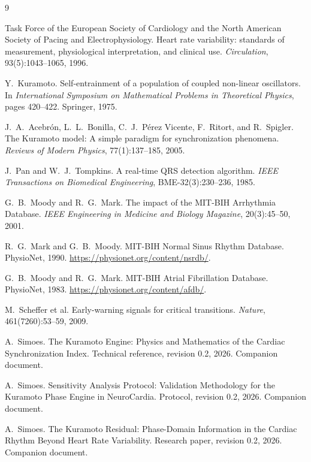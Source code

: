 \documentclass[11pt]{article}
\begin{document}
\begin{thebibliography}{9}

Task Force of the European Society of Cardiology and the North American
Society of Pacing and Electrophysiology. Heart rate variability:
standards of measurement, physiological interpretation, and clinical
use. \emph{Circulation}, 93(5):1043--1065, 1996.

Y.~Kuramoto. Self-entrainment of a population of coupled non-linear
oscillators. In \emph{International Symposium on Mathematical Problems
in Theoretical Physics}, pages 420--422. Springer, 1975.

J.~A.~Acebr\'on, L.~L.~Bonilla, C.~J.~P\'erez Vicente, F.~Ritort, and
R.~Spigler. The Kuramoto model: A simple paradigm for synchronization
phenomena. \emph{Reviews of Modern Physics}, 77(1):137--185, 2005.

J.~Pan and W.~J.~Tompkins. A real-time QRS detection algorithm.
\emph{IEEE Transactions on Biomedical Engineering},
BME-32(3):230--236, 1985.

G.~B.~Moody and R.~G.~Mark. The impact of the MIT-BIH Arrhythmia
Database. \emph{IEEE Engineering in Medicine and Biology Magazine},
20(3):45--50, 2001.

R.~G.~Mark and G.~B.~Moody. MIT-BIH Normal Sinus Rhythm Database.
PhysioNet, 1990. \url{https://physionet.org/content/nsrdb/}.

G.~B.~Moody and R.~G.~Mark. MIT-BIH Atrial Fibrillation Database.
PhysioNet, 1983. \url{https://physionet.org/content/afdb/}.

M.~Scheffer et al. Early-warning signals for critical transitions.
\emph{Nature}, 461(7260):53--59, 2009.

A.~Simoes. The Kuramoto Engine: Physics and Mathematics of the Cardiac
Synchronization Index. Technical reference, revision 0.2, 2026.
Companion document.

A.~Simoes. Sensitivity Analysis Protocol: Validation Methodology for
the Kuramoto Phase Engine in NeuroCardia. Protocol, revision 0.2,
2026. Companion document.

A.~Simoes. The Kuramoto Residual: Phase-Domain Information in the
Cardiac Rhythm Beyond Heart Rate Variability. Research paper, revision
0.2, 2026. Companion document.

\end{thebibliography}
\end{document}
